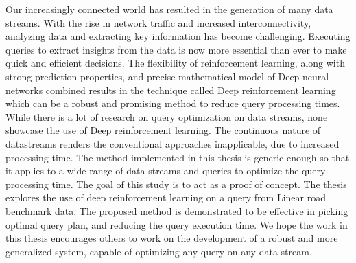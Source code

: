 Our increasingly connected world has resulted in the generation of many data streams. With the rise in network traffic and increased interconnectivity, analyzing data and extracting key information has become challenging. Executing queries to extract insights from the data is now more essential than ever to make quick and efficient decisions. The flexibility of reinforcement learning, along with strong prediction properties, and precise mathematical model of Deep neural networks combined results in the technique called Deep reinforcement learning which can be a robust and promising method to reduce query processing times. While there is a lot of research on query optimization on data streams, none showcase the use of Deep reinforcement learning. The continuous nature of datastreams renders the conventional approaches inapplicable, due to increased processing time. The method implemented in this thesis is generic enough so that it applies to a wide range of data streams and queries to optimize the query processing time. The goal of this study is to act as a proof of concept. The thesis explores the use of deep reinforcement learning on a query from Linear road benchmark data. The proposed method is demonstrated to be effective in picking optimal query plan, and reducing the query execution time. We hope the work in this thesis encourages others to work on the development of a robust and more generalized system, capable of optimizing any query on any data stream.

